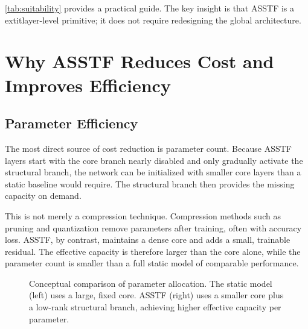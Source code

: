 \documentclass[11pt,a4paper]{article}
\theoremstyle{definition}
\begin{document}
\cref{tab:suitability} provides a practical guide. The key insight is that ASSTF is a 	extit{layer-level primitive}; it does not require redesigning the global architecture.


\section{Why ASSTF Reduces Cost and Improves Efficiency}
\label{sec:efficiency}

\subsection{Parameter Efficiency}
\label{subsec:param_eff}

The most direct source of cost reduction is parameter count. Because ASSTF layers start with the core branch nearly disabled and only gradually activate the structural branch, the network can be initialized with smaller core layers than a static baseline would require. The structural branch then provides the missing capacity on demand.

This is not merely a compression technique. Compression methods such as pruning and quantization remove parameters after training, often with accuracy loss. ASSTF, by contrast, maintains a dense core and adds a small, trainable residual. The effective capacity is therefore larger than the core alone, while the parameter count is smaller than a full static model of comparable performance.

\begin{figure}[t]
\centering
{}
\caption{Conceptual comparison of parameter allocation. The static model (left) uses a large, fixed core. ASSTF (right) uses a smaller core plus a low-rank structural branch, achieving higher effective capacity per parameter.}
\label{fig:param_eff}
\end{figure}
\end{document}
